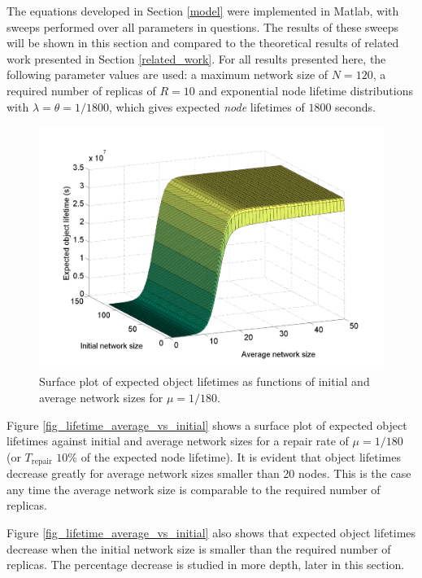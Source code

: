 \documentclass[10pt,a4paper,conference]{IEEEtran}
\begin{document}
The equations developed in Section \ref{model} were implemented in Matlab, with sweeps performed over all parameters in questions. The results of these sweeps will be shown in this section and compared to the theoretical results of related work presented in Section \ref{related_work}. For all results presented here, the following parameter values are used: a maximum network size of $N=120$, a required number of replicas of $R = 10$ and exponential node lifetime distributions with $\lambda = \theta = 1/1800$, which gives expected \emph{node} lifetimes of $1800$ seconds.


\begin{figure}[htbp]
 \centering
 \includegraphics[clip=true, viewport=2.0cm 1.0cm 27.5cm 19.15cm, width=0.8\columnwidth]{lifetime_av_init_groupsize}
 \caption{Surface plot of expected object lifetimes as functions of initial and average network sizes for $\mu = 1/180$.}
 \label{fig_lifetime_average_vs_initial_rep}
\end{figure}

Figure \ref{fig_lifetime_average_vs_initial} shows a surface plot of expected object lifetimes against initial and average network sizes for a repair rate of $\mu = 1/180$ (or $T_{\textrm{repair}}$ $10\%$ of the expected node lifetime). It is evident that object lifetimes decrease greatly for average network sizes smaller than 20 nodes. This is the case any time the average network size is comparable to the required number of replicas.

Figure \ref{fig_lifetime_average_vs_initial} also shows that expected object lifetimes decrease when the initial network size is smaller than the required number of replicas. The percentage decrease is studied in more depth, later in this section.
\end{document}

